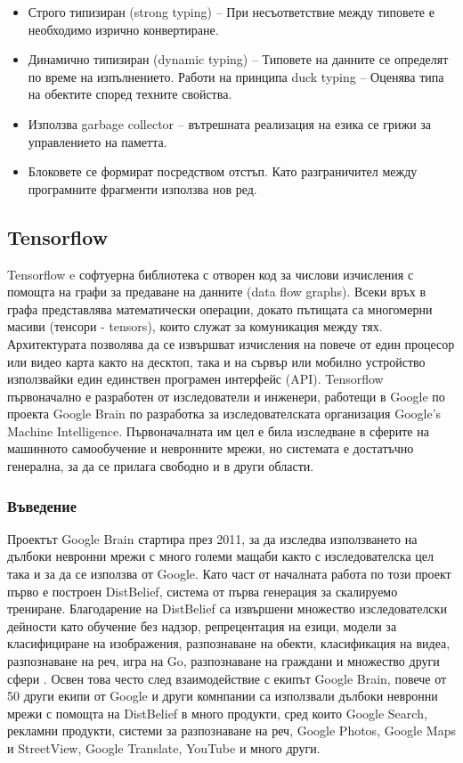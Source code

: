 \begin{itemize}
\item Строго типизиран (strong typing) – При несъответствие между типовете е необходимо изрично конвертиране.
\item Динамично типизиран (dynamic typing) – Типовете на данните се определят по време на изпълнението. Работи на принципа duck typing – Оценява типа на обектите според техните свойства.
\item Използва garbage collector – вътрешната реализация на езика се грижи за управлението на паметта.
\item Блоковете се формират посредством отстъп. Като разграничител между програмните фрагменти използва нов ред.
\end{itemize}

\subsection{Tensorflow}

Tensorflow e софтуерна библиотека с отворен код за числови изчисления с помощта на графи за предаване на данните (data flow graphs). Всеки връх в графа представлява математически операции, докато пътищата са многомерни масиви (тенсори - tensors), които служат за комуникация между тях. Архитектурата позволява да се извършват изчисления на повече от един процесор или видео карта както на десктоп, така и на сървър или мобилно устройство използвайки един единствен програмен интерфейс (API). Tensorflow първоначално е разработен от изследователи и инженери, работещи в Google по проекта Google Brain \cite{GoogleBrain} по разработка за изследователската организация Google's Machine Intelligence. Първоначалната им цел е била изследване в сферите на машинното самообучение и невронните мрежи, но системата е достатъчно генерална, за да се прилага свободно и в други области. \cite{Tensorflow}

\subsubsection{Въведение}

Проектът Google Brain стартира през 2011, за да изследва използването на дълбоки невронни мрежи с много големи мащаби както с изследователска цел така и за да се използва от Google. Като част от началната работа по този проект първо е построен DistBelief, система от първа генерация за скалируемо трениране. Благодарение на DistBelief са извършени множество изследователски дейности като обучение без надзор, репрецентация на езици, модели за класифициране на изображения, разпознаване на обекти, класификация на видеа, разпознаване на реч, игра на Go, разпознаване на граждани и множество други сфери \cite{TensorflowDetails}. Освен това често след взаимодействие с екипът Google Brain, повече от 50 други екипи от Google и други комнпании са използвали дълбоки невронни мрежи с помощта на DistBelief в много продукти, сред които Google Search, рекламни продукти, системи за разпознаване на реч, Google Photos, Google Maps и StreetView, Google Translate, YouTube и много други. 

